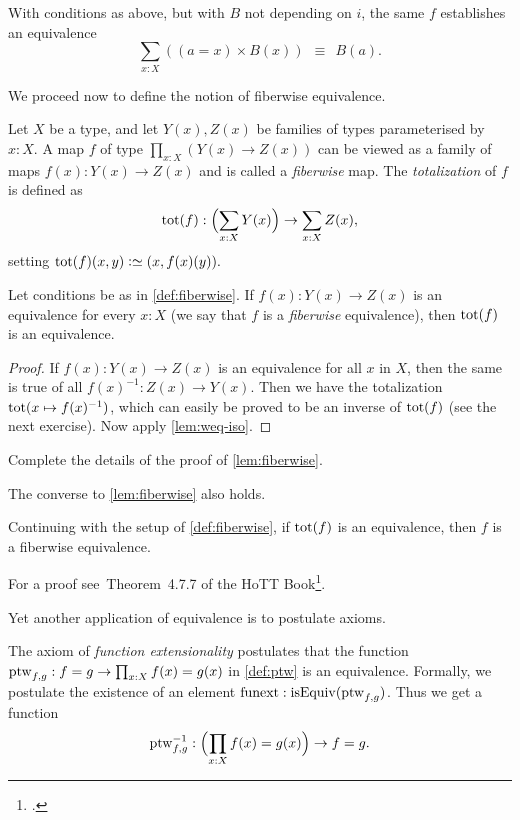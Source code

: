 \begin{corollary}\label{cor:contract-away}
With conditions as above, but with $B$ not depending on $i$, the same $f$
establishes an equivalence
\[
 \sum_{x:X} ((a=x)\times B(x))~~\equiv~~B(a).
\]
\end{corollary}

We proceed now to define the notion of fiberwise equivalence.

\begin{definition}\label{def:fiberwise}
Let $X$ be a type, and let $Y(x),Z(x)$ be families of types parameterised
by $x:X$. A map $f$ of type $\prod_{x:X}(Y(x)\to Z(x))$
can be viewed as a family of maps $f(x): Y(x)\to Z(x)$ and is called a 
\emph{fiberwise} map. The \emph{totalization} of $f$ is defined as
\[
  \tot(f) : \Bigl(\sum_{x:X} Y(x)\Bigr) \to \sum_{x:X} Z(x),
\]
setting $\tot(f)(x,y)\defeq (x,f(x)(y)).$
\end{definition}

\begin{lemma}\label{lem:fiberwise}
Let conditions be as in \cref{def:fiberwise}.
If $f(x): Y(x) \to Z(x)$ is an equivalence for every $x:X$
(we say that $f$ is a \emph{fiberwise} equivalence),
then $\tot(f)$ is an equivalence.
\end{lemma}

\begin{proof}
If $f(x): Y(x) \to Z(x)$ is an equivalence for all $x$ in $X$,
then the same is true of all $f(x)^{-1}: Z(x) \to Y(x)$.
Then we have the totalization $\tot(x\mapsto f(x)^{-1})$,
which can easily be proved to be an inverse of $\tot(f)$
(see the next exercise). Now apply \cref{lem:weq-iso}.
\end{proof}

\begin{xca}\label{xca:fiberwise}
Complete the details of the proof of \cref{lem:fiberwise}.
\end{xca}

The converse to \cref{lem:fiberwise} also holds.
\begin{lemma}\label{lem:fiberwise-equiv-from-tot}
  Continuing with the setup of \cref{def:fiberwise},
  if $\tot(f)$ is an equivalence, then $f$ is a fiberwise equivalence.
\end{lemma}
For a proof see~Theorem~4.7.7 of the HoTT Book\footcite{hottbook}.

Yet another application of  equivalence is to postulate axioms.

\begin{principle}\label{def:funext}
The axiom of \emph{function extensionality} postulates that the function
$\ptw_{f,g}: f=g \to \prod_{x:X} f(x)=g(x)$ in \cref{def:ptw} is an equivalence.
Formally, we postulate the existence of an element $\funext : \isEq(\ptw_{f,g})$.
Thus we get a function 
\[
  \inv{\ptw}_{f,g}: \Bigl(\prod_{x:X} f(x)=g(x)\Bigr) \to f=g.\qedhere
\]
\end{principle}

